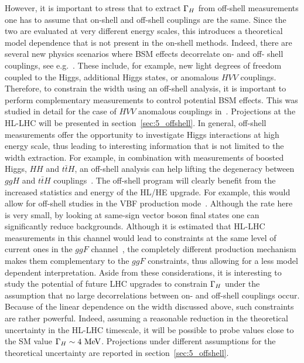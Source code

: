However, it is important to stress that to extract ${\Gamma_H}$ from off-shell
measurements one has to assume that on-shell and off-shell couplings are the same. Since the two
are evaluated at very different energy scales, this introduces a theoretical model dependence that is not present in the on-shell methods. 
Indeed, there are several new physics scenarios where BSM effects decorrelate on- and off- shell 
couplings, see e.g.~\cite{Englert:2014aca,Logan:2014ppa,Englert:2014ffa}. 
These include, for example, new light degrees of freedom coupled to the Higgs,
additional Higgs states, or anomalous $HVV$ couplings. Therefore, to constrain the width using an off-shell analysis,
 it is important to perform complementary measurements to control potential BSM effects. 
This was studied in detail for the case of $HVV$ anomalous couplings in~\cite{Anderson:2013afp}. 
 Projections at the HL-LHC will be presented in section~\ref{sec:5_offshell}. 
In general, off-shell measurements offer the opportunity to investigate Higgs interactions at 
high energy scale, thus leading to interesting information that is not limited to the width
extraction. For example, in combination with measurements of boosted Higgs, $HH$ and $t\bar tH$, 
an off-shell analysis can help lifting the degeneracy between $ggH$ and $t\bar tH$ 
couplings~\cite{Azatov:2014jga}. The off-shell program will clearly benefit from the 
increased statistics and energy of the HL/HE upgrade. For example, this would allow for 
off-shell studies in the VBF production mode~\cite{Campbell:2015vwa}. 
Although the rate here is very small,
by looking at same-sign vector boson final states one can significantly reduce backgrounds. 
%
Although it is estimated that HL-LHC measurements in this channel would lead to constraints
at the same level of current ones in the $ggF$ channel~\cite{Campbell:2015vwa}, 
the completely different 
production mechanism
makes them complementary to the $ggF$ constraints, thus allowing for a less model dependent
interpretation.
%
Aside from these considerations, it is interesting to study the potential of 
future LHC upgrades to constrain ${\Gamma_H}$ under the assumption that 
no large decorrelations between on- and off-shell couplings occur. Because of the linear dependence on
the width discussed above, such constraints are rather powerful. Indeed, assuming a reasonable
reduction in the theoretical uncertainty in the HL-LHC timescale, 
it will be possible to probe values close to the SM value
${\Gamma_H}\sim 4~{\rm MeV}$. Projections under different assumptions for the theoretical uncertainty
are reported in section~\ref{sec:5_offshell}. 


